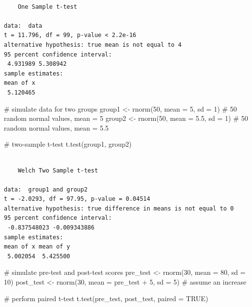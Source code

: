\documentclass[
  singlecolumn]{article}
\newenvironment{Shaded}{}{}
\newcommand{\AttributeTok}[1]{\textcolor[rgb]{0.84,0.23,0.29}{#1}}
\newcommand{\CommentTok}[1]{\textcolor[rgb]{0.42,0.45,0.49}{#1}}
\newcommand{\ConstantTok}[1]{\textcolor[rgb]{0.00,0.36,0.77}{#1}}
\newcommand{\DecValTok}[1]{\textcolor[rgb]{0.00,0.36,0.77}{#1}}
\newcommand{\FloatTok}[1]{\textcolor[rgb]{0.00,0.36,0.77}{#1}}
\newcommand{\FunctionTok}[1]{\textcolor[rgb]{0.44,0.26,0.76}{#1}}
\newcommand{\NormalTok}[1]{\textcolor[rgb]{0.14,0.16,0.18}{#1}}
\newcommand{\OtherTok}[1]{\textcolor[rgb]{0.44,0.26,0.76}{#1}}
\newcommand{\SpecialCharTok}[1]{\textcolor[rgb]{0.00,0.36,0.77}{#1}}
\theoremstyle{definition}
\theoremstyle{remark}
\begin{document}
\begin{verbatim}

    One Sample t-test

data:  data
t = 11.796, df = 99, p-value < 2.2e-16
alternative hypothesis: true mean is not equal to 4
95 percent confidence interval:
 4.931989 5.308942
sample estimates:
mean of x 
 5.120465 
\end{verbatim}

\begin{Shaded}
\begin{Highlighting}[]
\CommentTok{\# simulate data for two groups}
\NormalTok{group1 }\OtherTok{\textless{}{-}} \FunctionTok{rnorm}\NormalTok{(}\DecValTok{50}\NormalTok{, }\AttributeTok{mean =} \DecValTok{5}\NormalTok{, }\AttributeTok{sd =} \DecValTok{1}\NormalTok{) }\CommentTok{\# 50 random normal values, mean = 5}
\NormalTok{group2 }\OtherTok{\textless{}{-}} \FunctionTok{rnorm}\NormalTok{(}\DecValTok{50}\NormalTok{, }\AttributeTok{mean =} \FloatTok{5.5}\NormalTok{, }\AttributeTok{sd =} \DecValTok{1}\NormalTok{) }\CommentTok{\# 50 random normal values, mean = 5.5}

\CommentTok{\# two{-}sample t{-}test}
\FunctionTok{t.test}\NormalTok{(group1, group2)}
\end{Highlighting}
\end{Shaded}

\begin{verbatim}

    Welch Two Sample t-test

data:  group1 and group2
t = -2.0293, df = 97.95, p-value = 0.04514
alternative hypothesis: true difference in means is not equal to 0
95 percent confidence interval:
 -0.837548023 -0.009343886
sample estimates:
mean of x mean of y 
 5.002054  5.425500 
\end{verbatim}

\begin{Shaded}
\begin{Highlighting}[]
\CommentTok{\# simulate pre{-}test and post{-}test scores}
\NormalTok{pre\_test }\OtherTok{\textless{}{-}} \FunctionTok{rnorm}\NormalTok{(}\DecValTok{30}\NormalTok{, }\AttributeTok{mean =} \DecValTok{80}\NormalTok{, }\AttributeTok{sd =} \DecValTok{10}\NormalTok{)}
\NormalTok{post\_test }\OtherTok{\textless{}{-}} \FunctionTok{rnorm}\NormalTok{(}\DecValTok{30}\NormalTok{, }\AttributeTok{mean =}\NormalTok{  pre\_test }\SpecialCharTok{+} \DecValTok{5}\NormalTok{, }\AttributeTok{sd =} \DecValTok{5}\NormalTok{) }\CommentTok{\# assume an increase}

\CommentTok{\# perform paired t{-}test}
\FunctionTok{t.test}\NormalTok{(pre\_test, post\_test, }\AttributeTok{paired =} \ConstantTok{TRUE}\NormalTok{)}
\end{Highlighting}
\end{Shaded}
\end{document}
